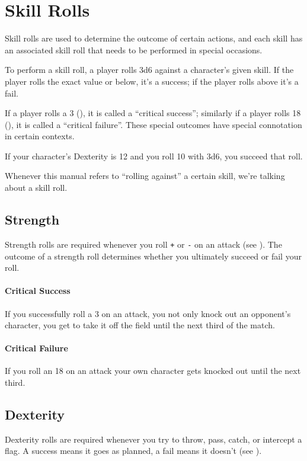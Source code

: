 \section{Skill Rolls}\label{skill-rolls}
Skill rolls are used to determine the outcome of certain actions, and each skill has an associated skill roll that needs to be performed in special occasions.

To perform a skill roll, a player rolls 3d6 against a character's given skill.
If the player rolls the exact value or below, it's a success; if the player rolls above it's a fail.

If a player rolls a 3 (), it is called a ``critical success''; similarly if a player rolls 18 (), it is called a ``critical failure''.
These special outcomes have special connotation in certain contexts.

\begin{example}
    If your character's Dexterity is 12 and you roll 10 with 3d6, you succeed that roll.
\end{example}

\begin{note}
    Whenever this manual refers to ``rolling against'' a certain skill, we're talking about a skill roll.
\end{note}

\subsection{Strength}
Strength rolls are required whenever you roll \texttt{+} or \texttt{-} on an attack (see ).
The outcome of a strength roll determines whether you ultimately succeed or fail your roll.

\paragraph{Critical Success} If you successfully roll a 3 on an attack, you not only knock out an opponent's character, you get to take it off the field until the next third of the match.

\paragraph{Critical Failure} If you roll an 18 on an attack your own character gets knocked out until the next third.
\subsection{Dexterity}
Dexterity rolls are required whenever you try to throw, pass, catch, or intercept a flag.
A success means it goes as planned, a fail means it doesn't (see ).

